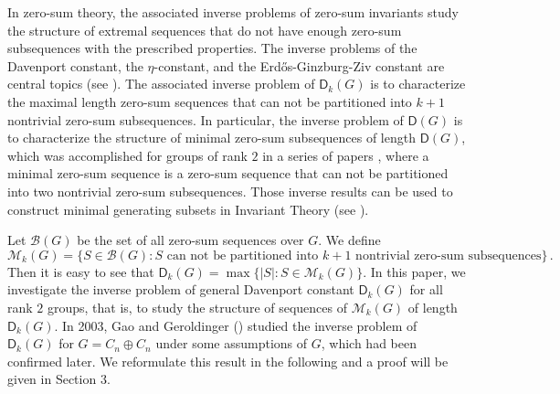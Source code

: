 \documentclass[11pt]{amsart}
\theoremstyle{definition}
\numberwithin{equation}{section}
\begin{document}
In  zero-sum theory, the associated inverse problems of zero-sum invariants  study the structure of extremal sequences that do not have enough zero-sum subsequences with the prescribed properties. The inverse problems of the Davenport constant, the $\eta$-constant, and the Erd\H os-Ginzburg-Ziv constant are central topics (see \cite{Yu07a,Yu-Ze11b,Sa-Ch07a,Sa-Ch12a,Ga-Pe-Wa11a,GeF21a,Eb-Gr24a,Gr-Li22a, Gr-Li22b,Sc10b,Sc12a,Gi-Sc19b,Gr-uzi}). 
The associated inverse problem of $\mathsf D_k(G)$ is to characterize the maximal length zero-sum sequences that can not be partitioned into $k+1$ nontrivial zero-sum subsequences. In particular, the inverse problem of $\mathsf D(G)$ is to characterize the structure of minimal zero-sum subsequences of length $\mathsf D(G)$, which was accomplished for groups of rank $2$ in a series of papers \cite{Reiher-propB-thesis} \cite{Gao-Ger-propB} \cite{propB-GGG} \cite{Sc10b} \cite{Schlage-case9-propB},
   where a minimal zero-sum sequence is a zero-sum sequence that can not be partitioned into two nontrivial zero-sum subsequences. Those inverse results can be used to construct minimal  generating subsets in Invariant Theory (see \cite[Proposition 4.7]{Cz-Do-Ge16}).
   
   
    Let $\mathcal B(G)$ be the set of all zero-sum sequences over $G$. We define
   \[
   \mathcal M_k(G)=\{S\in \mathcal B(G)\colon S \text{ can not be partitioned into $k+1$ nontrivial zero-sum subsequences}\}\,.
   \]
   Then it is easy to see that $\mathsf D_k(G)=\max \{|S|\colon S\in \mathcal M_k(G)\}$.
   In this paper, we investigate the inverse problem of general Davenport constant $\mathsf D_k(G)$ for all rank $2$ groups, that is, to study the structure of sequences of $\mathcal M_k(G)$ of length $\mathsf D_k(G)$. In 2003, Gao and Geroldinger (\cite[Theorem 7.1]{Gao-Ger-propB}) studied the inverse problem of $\mathsf D_k(G)$ for $G=C_n\oplus C_n$ under some assumptions of $G$, which had been confirmed later.  We reformulate this result in the following  and  a proof  will be given in Section 3.
   
\end{document}
